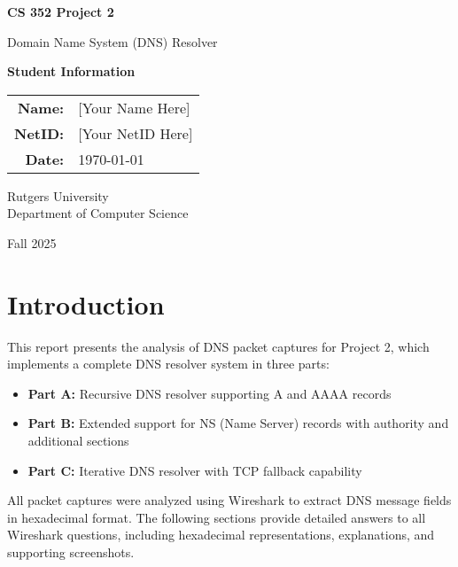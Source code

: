 \documentclass[11pt,letterpaper]{article}
\begin{document}
\begin{titlepage}
    \centering
    \vspace*{2cm}
    
    {\Huge\bfseries CS 352 Project 2\par}
    \vspace{0.5cm}
    {\Large Domain Name System (DNS) Resolver\par}
    \vspace{2cm}
    
    {\Large\textbf{Student Information}\par}
    \vspace{0.5cm}
    \begin{tabular}{rl}
        \textbf{Name:} & [Your Name Here] \\
        \textbf{NetID:} & [Your NetID Here] \\
        \textbf{Date:} & \today \\
    \end{tabular}
    
    \vfill
    
    {\large Rutgers University\\
    Department of Computer Science\par}
    \vspace{1cm}
    
    {\large Fall 2025\par}
\end{titlepage}

\tableofcontents
\newpage

\section{Introduction}

This report presents the analysis of DNS packet captures for Project 2, which implements a complete DNS resolver system in three parts:

\begin{itemize}
    \item \textbf{Part A:} Recursive DNS resolver supporting A and AAAA records
    \item \textbf{Part B:} Extended support for NS (Name Server) records with authority and additional sections
    \item \textbf{Part C:} Iterative DNS resolver with TCP fallback capability
\end{itemize}

All packet captures were analyzed using Wireshark to extract DNS message fields in hexadecimal format. The following sections provide detailed answers to all Wireshark questions, including hexadecimal representations, explanations, and supporting screenshots.
\end{document}
